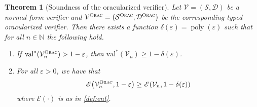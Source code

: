 \documentclass[11pt]{article}
\newtheorem{theorem}{Theorem}[section]
\theoremstyle{definition}
\newcommand{\N}{\ensuremath{\mathbb{N}}}
\DeclareMathOperator{\poly}{poly}
\newcommand{\val}{\ensuremath{\mathrm{val}}}
\newcommand{\eps}{\varepsilon}
\newcommand{\sampler}{\mathcal{S}}
\newcommand{\decider}{\mathcal{D}}
\newcommand{\verifier}{\mathcal{V}}
\newcommand{\gamestyle}[1]{\ensuremath{\textsc{#1}}\xspace}
\newcommand{\ora}{\gamestyle{Orac}}
\newcommand{\Ent}{\mathscr{E}}
\begin{document}
\begin{theorem}[Soundness of the oracularized verifier]
  \label{thm:oracle-soundness}
  Let $\verifier = (\sampler, \decider)$ be a normal form verifier and
  $\verifier^\ora = (\sampler^\ora,\decider^\ora)$ be the corresponding typed
  oracularized verifier.
  Then there exists a function $\delta(\eps) = \poly(\eps)$ such that for all $n
  \in \N$ the following hold.
  \begin{enumerate}
  \item If $\val^*(\verifier^\ora_n) > 1 - \eps$, then $\val^*(\verifier_n) \geq
    1 - \delta(\eps)$.
	\item For all $\eps > 0$, we have that
    \begin{equation*}
      \Ent \bigl( \verifier^\ora_n, 1 - \eps \bigr) \geq
      \Ent(\verifier_{n}, 1 - \delta(\eps))
    \end{equation*}
    where $\Ent(\cdot)$ is as in \cref{def:ent}.
  \end{enumerate}
\end{theorem}
\end{document}
